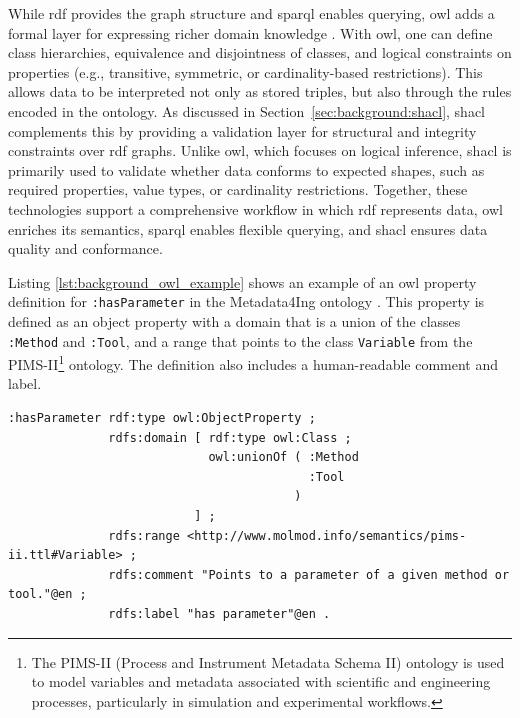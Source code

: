 While \gls{rdf} provides the graph structure and \gls{sparql} enables querying, \gls{owl} adds a formal layer for expressing richer domain knowledge \cite{owl2_overview,owl2_primer}. With \gls{owl}, one can define class hierarchies, equivalence and disjointness of classes, and logical constraints on properties (e.g., transitive, symmetric, or cardinality-based restrictions). This allows data to be interpreted not only as stored triples, but also through the rules encoded in the ontology. As discussed in Section~\ref{sec:background:shacl}, \gls{shacl} complements this by providing a validation layer for structural and integrity constraints over \gls{rdf} graphs. Unlike \gls{owl}, which focuses on logical inference, \gls{shacl} is primarily used to validate whether data conforms to expected shapes, such as required properties, value types, or cardinality restrictions. Together, these technologies support a comprehensive workflow in which \gls{rdf} represents data, \gls{owl} enriches its semantics, \gls{sparql} enables flexible querying, and \gls{shacl} ensures data quality and conformance. 

Listing \ref{lst:background_owl_example} shows an example of an \gls{owl} property definition for \texttt{:hasParameter} in the Metadata4Ing ontology \cite{metadata4ing_ontology}. This property is defined as an object property with a domain that is a union of the classes \texttt{:Method} and \texttt{:Tool}, and a range that points to the class \texttt{Variable} from the PIMS-II\footnote{The PIMS-II (Process and Instrument Metadata Schema II) ontology is used to model variables and metadata associated with scientific and engineering processes, particularly in simulation and experimental workflows.} ontology. The definition also includes a human-readable comment and label.

\begin{lstlisting}[float=htbp,style=turtle, caption={Definition for \texttt{:hasParameter} property in Metadata4Ing ontology\cite{metadata4ing_ontology}}, label={lst:background_owl_example}]
:hasParameter rdf:type owl:ObjectProperty ;
              rdfs:domain [ rdf:type owl:Class ;
                            owl:unionOf ( :Method
                                          :Tool
                                        )
                          ] ;
              rdfs:range <http://www.molmod.info/semantics/pims-ii.ttl#Variable> ;
              rdfs:comment "Points to a parameter of a given method or tool."@en ;
              rdfs:label "has parameter"@en .
\end{lstlisting}

